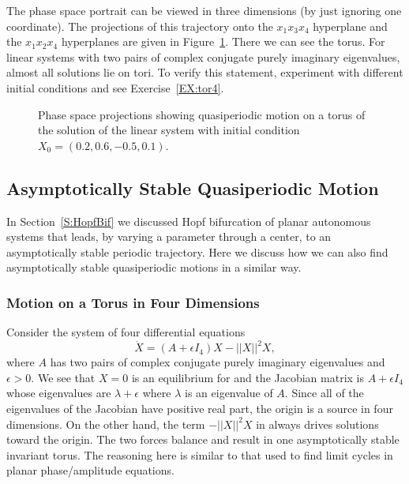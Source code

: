 \documentclass{ximera}
\begin{document}
The phase space portrait can be viewed in three dimensions (by just 
ignoring one coordinate).  The projections of this trajectory onto the 
$x_1x_3x_4$ hyperplane and the $x_1x_2x_4$ hyperplanes are given in 
Figure~\ref{F:ftorphase}.  There we can see the torus.  For 
linear systems with two pairs of complex conjugate purely imaginary
eigenvalues, almost all solutions lie on tori.  To verify this statement, 
experiment with different initial conditions and see Exercise~\ref{EX:tor4}. 

\begin{figure}[htb]
   \centerline{%
   }
   \caption{Phase space projections showing quasiperiodic motion on a torus of 
	the solution of the linear system \protect{} with initial 
	condition $X_0=(0.2,0.6,-0.5,0.1)$.}
   \label{F:ftorphase}
\end{figure}

\subsection*{Asymptotically Stable Quasiperiodic Motion}

In Section~\ref{S:HopfBif} we discussed Hopf bifurcation of planar autonomous 
systems that leads, by varying a parameter through a center, to an 
asymptotically stable periodic trajectory.  Here we discuss how we can also 
find asymptotically stable quasiperiodic motions 
in a similar way.  

\subsubsection*{Motion on a Torus in Four Dimensions}

Consider the system of four differential equations 
\begin{equation*}  \label{e:nonlintor}
\dot{X} = (A+\epsilon I_4)X - ||X||^2X,
\end{equation*}
where $A$ has two pairs of complex conjugate purely imaginary eigenvalues
and $\epsilon>0$.  We see that $X=0$ is an equilibrium for 
and the Jacobian 
matrix is $A+\epsilon I_4$ whose eigenvalues 
are $\lambda+\epsilon$ where $\lambda$ is an eigenvalue of $A$.  Since all 
of the eigenvalues of the Jacobian have positive real part, the origin is a 
source in four dimensions.  On the other hand, the term 
$-||X||^2X$ in  always drives solutions toward the origin. 
The two forces balance and result in one asymptotically stable invariant 
torus.   The reasoning here is similar to that used to find limit cycles in
planar phase/amplitude equations.
\end{document}
